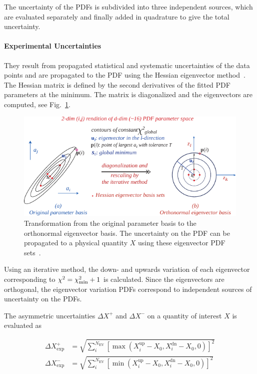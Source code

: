 The uncertainty of the PDFs is subdivided into three independent sources, which
are evaluated separately and finally added in quadrature to give the total
uncertainty.

\paragraph{Experimental Uncertainties} 
They result from propagated statistical and systematic uncertainties of the data
points and are propagated to the PDF using the Hessian eigenvector
method~\cite{Pumplin:2001ct}. The Hessian matrix is defined by the second
derivatives of the fitted PDF parameters at the \chisq minimum. The matrix is
diagonalized and the eigenvectors are computed, see
Fig.~\ref{fig:eigenvector_basis_set}. 

\begin{figure}[htb]
  \centering
  \includegraphics[width=1.0\textwidth]{figures/pdf_constraints/hessianmethod.pdf}
  \caption[Transformation of the parameter basis to the eigenvector basis.]
    {Transformation from the original parameter basis to the orthonormal
    eigenvector basis. The uncertainty on the PDF can be propagated to a
    physical quantity $X$ using these eigenvector PDF sets~\cite{Pumplin:2001ct}.}
    \label{fig:eigenvector_basis_set}
\end{figure}

Using an iterative method, the down- and upwards variation of each eigenvector
corresponding to $\chi^2 = \chi^2_{\mathrm{min}} + 1$ is calculated. Since the
eigenvectors are orthogonal, the eigenvector variation PDFs correspond to
independent sources of uncertainty on the PDFs.

The asymmetric uncertainties $\Delta X^+$ and $\Delta X^-$ on a quantity of
interest $X$ is evaluated as

\begin{align*}
  \Delta X^+_{\mathrm{exp}} &= \sqrt{\sum_i^{N_{\mathrm{EV}}} \left[ \max(X_i^{\mathrm{up}}
    -X_0, X_i^{\mathrm{dn}} - X_0, 0)\right]^2}\\
    \Delta X^-_{\mathrm{exp}} &= \sqrt{\sum_i^{N_{\mathrm{EV}}} \left[ \min(X_i^{\mathrm{up}} - X_0, X_i^{\mathrm{dn}} - X_0,0)\right]^2}
\end{align*}


